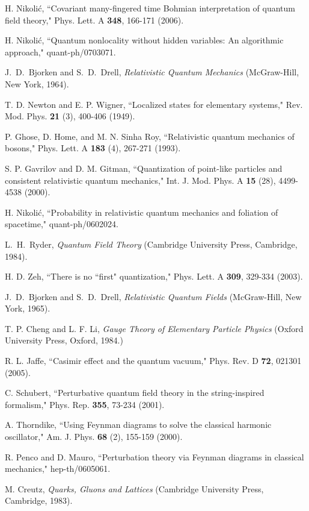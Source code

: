 \documentclass[12pt]{article}
\begin{document}
\begin{thebibliography}{99}
H. Nikoli\'c,
``Covariant many-fingered time Bohmian interpretation of quantum field
theory,"
Phys. Lett. A {\bf 348}, 166-171 (2006).

H. Nikoli\'c,
``Quantum nonlocality without hidden variables: An algorithmic approach,"
quant-ph/0703071.

J.~D.~Bjorken and S.~D.~Drell, {\it Relativistic Quantum Mechanics}
(McGraw-Hill, New York, 1964).

T. D. Newton and E. P. Wigner, 
``Localized states for elementary systems,"
Rev. Mod. Phys. {\bf 21} (3), 400-406 (1949).

P. Ghose, D. Home, and M. N. Sinha Roy,
``Relativistic quantum mechanics of bosons,"
Phys. Lett. A {\bf 183} (4), 267-271 (1993). 

S. P. Gavrilov and D. M. Gitman, 
``Quantization of point-like particles and consistent relativistic 
quantum mechanics,"
Int. J. Mod. Phys. A {\bf 15} (28), 4499-4538 (2000). 

H. Nikoli\'c, 
``Probability in relativistic quantum mechanics
and foliation of spacetime,"
quant-ph/0602024.

L.~H.~Ryder, {\it Quantum Field Theory} (Cambridge University Press,
Cambridge, 1984).

H. D. Zeh,
``There is no ``first" quantization,"
Phys. Lett. A {\bf 309}, 329-334 (2003).

J.~D.~Bjorken and S.~D.~Drell, {\it Relativistic Quantum Fields}
(McGraw-Hill, New York, 1965).

T. P. Cheng and L. F. Li, {\it Gauge Theory of Elementary 
Particle Physics} (Oxford University Press, Oxford, 1984.)

R. L. Jaffe, 
``Casimir effect and the quantum vacuum,"
Phys. Rev. D {\bf 72}, 021301 (2005).

C. Schubert,
``Perturbative quantum field theory in the string-inspired formalism,"
Phys. Rep. {\bf 355}, 73-234 (2001).

A. Thorndike,
``Using Feynman diagrams to solve the classical harmonic 
oscillator,"
Am. J. Phys. {\bf 68} (2), 155-159 (2000).

R. Penco and D. Mauro,
``Perturbation theory via Feynman diagrams in classical mechanics,"
hep-th/0605061.

M. Creutz,
{\it Quarks, Gluons and Lattices}
(Cambridge University Press, Cambridge, 1983).


\end{thebibliography}
\end{document}
